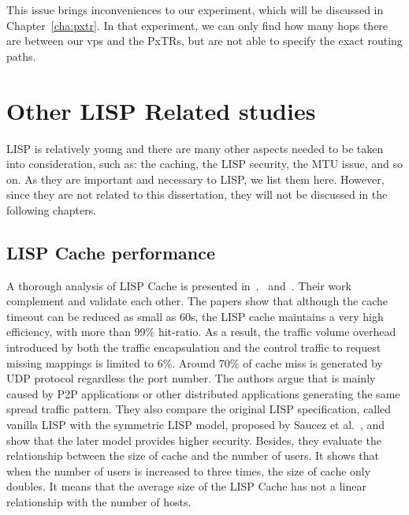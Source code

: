 This issue brings inconveniences to our experiment, which will be discussed in Chapter~\ref{cha:pxtr}. In that experiment, we can only find how many hops there are between our \acrshort{vp}s and the PxTRs, but are not able to specify the exact routing paths.

\section{Other LISP Related studies}
\label{subsec:other_studies}
LISP is relatively young and there are many other aspects needed to be taken into consideration, such as: the caching, the LISP security, the MTU issue, and so on. As they are important and necessary to LISP, we list them here. However, since they are not related to this dissertation, they will not be discussed in the following chapters.

\subsection{LISP Cache performance}
\label{subsec:cache}

A thorough analysis of LISP Cache is presented in~\cite{lispCacheCost},~\cite{lispCacheDive} and~\cite{kim2013caching}. Their work complement and validate each other. The papers %
show that although the cache timeout can be reduced %
as small as 60s, the LISP cache maintains a very high efficiency, with more than 99\% hit-ratio. As a result, %
the traffic volume overhead introduced by both the traffic encapsulation and the control traffic to request missing mappings is limited to 6\%. Around 70\% of cache miss is generated by UDP protocol regardless the port number. The authors argue that is mainly caused by P2P applications or other distributed applications generating the same spread traffic pattern. They also compare the original LISP specification, called vanilla LISP with the symmetric LISP model, proposed by Saucez et al.~\cite{lispCacheDive}, and show that the later model provides higher security. Besides, they evaluate the relationship between the size of cache and the number of users. It shows that when the number of users is increased to three times, the size of cache only doubles. It means that the average size of the LISP Cache has not a linear relationship with the number of hosts.

